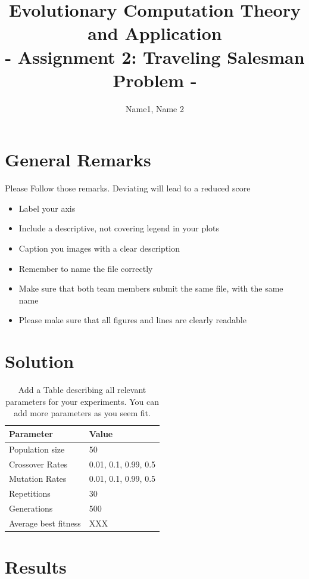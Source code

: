 \documentclass[a4paper, 12pt]{article}
\title{Evolutionary Computation Theory and Application  \\
				- Assignment 2: Traveling Salesman Problem -}
\author{Name1, Name 2}
\date{}
\begin{document}
\maketitle

\section{General Remarks }

Please Follow those remarks. Deviating will lead to a reduced score

\begin{itemize}
	\item Label your axis 
	\item Include a descriptive, not covering legend in your plots
	\item Caption you images with a clear description
	\item Remember to name the file correctly
	\item Make sure that both team members submit the same file, with the same name
	\item Please make sure that all figures and lines are clearly readable
\end{itemize}

\section{Solution}

\begin{table} [h!]
	  \centering
\begin{tabular}{|l|l|}
\hline
\textbf{Parameter} & \textbf{Value}   \\
\hline
Population size & 50 \\
\hline
Crossover Rates &  0.01, 0.1, 0.99, 0.5 \\
\hline
Mutation Rates & 0.01, 0.1, 0.99, 0.5 \\
\hline
Repetitions & 30 \\
\hline
Generations & 500\\
\hline
Average best fitness		 & XXX \\
\hline
\end{tabular}
\caption{Add a Table describing all relevant parameters for your experiments. You can add more parameters as you seem fit. }
\label{table:defparams}
\end{table}

\newpage
\section{Results}
\end{document}
